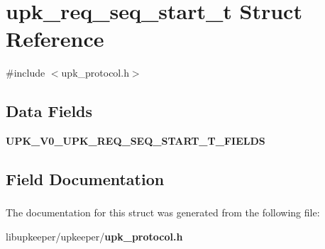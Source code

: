 \section{upk\_\-req\_\-seq\_\-start\_\-t Struct Reference}
\label{structupk__req__seq__start__t}


{\ttfamily \#include $<$upk\_\-protocol.h$>$}

\subsection*{Data Fields}
\begin{DoxyCompactItemize}
\item 
{\bf UPK\_\-V0\_\-UPK\_\-REQ\_\-SEQ\_\-START\_\-T\_\-FIELDS}
\end{DoxyCompactItemize}


\subsection{Field Documentation}
\subsubsection[{UPK\_\-V0\_\-UPK\_\-REQ\_\-SEQ\_\-START\_\-T\_\-FIELDS}]{}\label{structupk__req__seq__start__t_aaa301b5afff419786ec000e1c759b8af}


The documentation for this struct was generated from the following file:\begin{DoxyCompactItemize}
\item 
libupkeeper/upkeeper/{\bf upk\_\-protocol.h}\end{DoxyCompactItemize}
